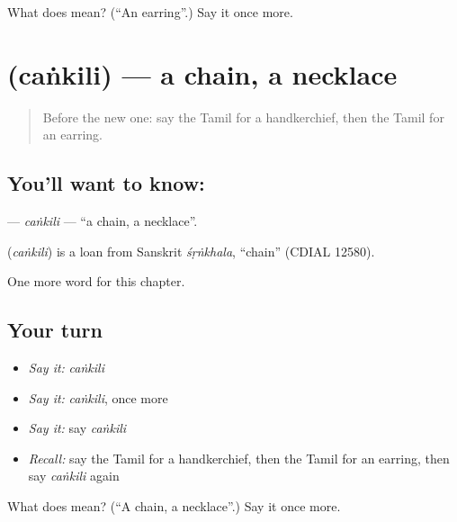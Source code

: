 \begin{tcolorbox}[breakable,colback=teal!4,colframe=teal!35!black,title={Before you move on}]
What does  mean? (\textquotedblleft{}An earring\textquotedblright{}.) Say it once more.
\end{tcolorbox}
\section[\texorpdfstring{\ta{சங்கிலி} (caṅkili)}{சங்கிலி (caṅkili)}]{ (caṅkili) — a chain, a necklace}

\label{lesson:TA-C270-cankili}



\begin{quote}
Before the new one: say the Tamil for a handkerchief, then the Tamil for an earring.
\end{quote}

\subsection*{You'll want to know: }
\textbf{} — \emph{caṅkili} — \textquotedblleft{}a chain, a necklace\textquotedblright{}.

\begin{cousinweb}
\textbf{} (\emph{caṅkili}) is a loan from Sanskrit \emph{śṛṅkhala}, \textquotedblleft{}chain\textquotedblright{} (CDIAL 12580).
\end{cousinweb}

\begin{grammarlens}[title={What you've built}]
One more word for this chapter.
\end{grammarlens}

\subsection*{Your turn}
\begin{itemize}
\raggedright
  \item \emph{Say it:} \emph{caṅkili}
  \item \emph{Say it:} \emph{caṅkili}, once more
  \item \emph{Say it:} say \emph{caṅkili}
  \item \emph{Recall:} say the Tamil for a handkerchief, then the Tamil for an earring, then say \emph{caṅkili} again
\end{itemize}

\begin{tcolorbox}[breakable,colback=teal!4,colframe=teal!35!black,title={Before you move on}]
What does  mean? (\textquotedblleft{}A chain, a necklace\textquotedblright{}.) Say it once more.
\end{tcolorbox}
